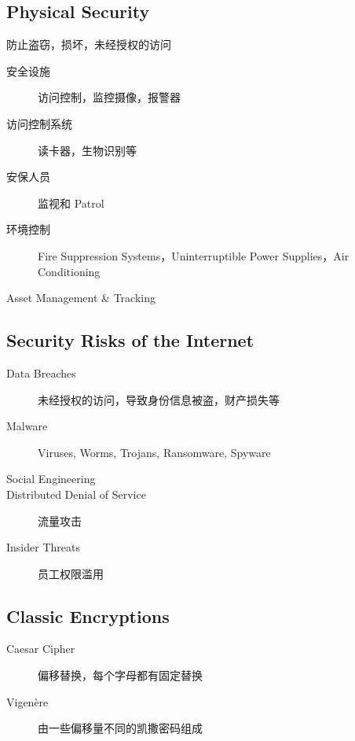 \documentclass[11pt,journal,compsoc]{IEEEtran}
\begin{document}
\subsection{Physical Security}

防止盗窃，损坏，未经授权的访问

\begin{description}
    \item[安全设施] 访问控制，监控摄像，报警器

    \item[访问控制系统] 读卡器，生物识别等

    \item[安保人员] 监视和 Patrol

    \item[环境控制] Fire Suppression Systems，Uninterruptible Power Supplies，Air Conditioning

    \item[Asset Management \& Tracking]
\end{description}


\subsection{Security Risks of the Internet}

\begin{description}
    \item[Data Breaches] 未经授权的访问，导致身份信息被盗，财产损失等

    \item[Malware] Viruses, Worms, Trojans, Ransomware, Spyware

    \item[Social Engineering]

    \item[Distributed Denial of Service] 流量攻击

    \item[Insider Threats] 员工权限滥用
\end{description}


\subsection{Classic Encryptions}

\begin{description}
    \item[Caesar Cipher] 偏移替换，每个字母都有固定替换

    \item[Vigenère] 由一些偏移量不同的凯撒密码组成
\end{description}
\end{document}
